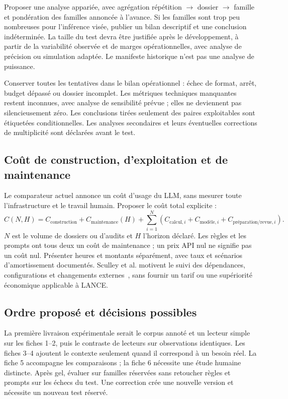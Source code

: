 \documentclass[11pt,a4paper]{article}
\begin{document}
Proposer une analyse appariée, avec agrégation répétition $\rightarrow$ dossier
$\rightarrow$ famille et pondération des familles annoncée à l'avance.
Si les familles sont trop peu nombreuses pour l'inférence visée, publier un
bilan descriptif et une conclusion indéterminée. La taille du test devra être
justifiée après le développement, à partir de la variabilité observée et de
marges opérationnelles, avec analyse de précision ou simulation adaptée.
Le manifeste historique n'est pas une analyse de puissance.

Conserver toutes les tentatives dans le bilan opérationnel : échec de format,
arrêt, budget dépassé ou dossier incomplet. Les métriques techniques manquantes
restent inconnues, avec analyse de sensibilité prévue ; elles ne deviennent
pas silencieusement zéro. Les conclusions tirées seulement des paires
exploitables sont étiquetées conditionnelles. Les analyses secondaires et
leurs éventuelles corrections de multiplicité sont déclarées avant le test.

\subsection{Coût de construction, d'exploitation et de maintenance}
Le comparateur actuel annonce un coût d'usage du LLM, sans mesurer toute
l'infrastructure et le travail humain. Proposer le coût total explicite :
\[
 C(N,H)=C_{\text{construction}}+C_{\text{maintenance}}(H)
       +\sum_{i=1}^{N}(C_{\text{calcul},i}+C_{\text{modèle},i}
       +C_{\text{préparation/revue},i}).
\]
$N$ est le volume de dossiers ou d'audits et $H$ l'horizon déclaré. Les règles
et les prompts ont tous deux un coût de maintenance ; un prix API nul ne
signifie pas un coût nul. Présenter heures et montants séparément, avec taux
et scénarios d'amortissement documentés. Sculley et al. motivent le suivi des
dépendances, configurations et changements externes~\cite{sculley}, sans
fournir un tarif ou une supériorité économique applicable à LANCE.

\subsection{Ordre proposé et décisions possibles}
La première livraison expérimentale serait le corpus annoté et un lecteur
simple sur les fiches 1--2, puis le contraste de lecteurs sur observations
identiques. Les fiches 3--4 ajoutent le contexte seulement quand il correspond
à un besoin réel. La fiche 5 accompagne les comparaisons ; la fiche 6 nécessite
une étude humaine distincte. Après gel, évaluer sur familles réservées sans
retoucher règles et prompts sur les échecs du test. Une correction crée une
nouvelle version et nécessite un nouveau test réservé.
\end{document}
